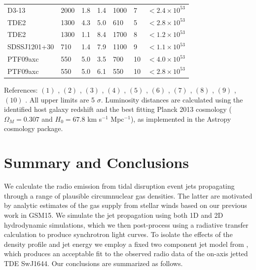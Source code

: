 \documentclass[usenatbib,fleqn]{mnras}
\begin{document}
\begin{table}
\begin{threeparttable}
\begin{tabular*}{1.5\columnwidth}{lllllll}
D3-13 & 2000 & 1.8 & 1.4 & 1000 & 7 & $< 2.4 \times 10^{ 53 }$ \\
TDE2 & 1300 & 4.3 & 5.0 & 610 & 5 & $< 2.8 \times 10^{ 53 }$ \\
TDE2 & 1300 & 1.1 & 8.4 & 1700 & 8 & $< 1.2 \times 10^{ 53 }$ \\
SDSSJ1201+30 & 710 & 1.4 & 7.9 & 1100 & 9 & $< 1.1 \times 10^{ 53 }$ \\
PTF09axc & 550 & 5.0 & 3.5 & 700 & 10 & $< 4.0 \times 10^{ 53 }$ \\
PTF09axc & 550 & 5.0 & 6.1 & 550 & 10 & $< 2.8 \times 10^{ 53 }$\\
\end{tabular*}
\begin{tablenotes}
\item References: $(1)$ \citet{Alexander+2015, van-Velzen+2015}, $(2)$
  \citet{Berger+2012, Zauderer+2013} , $(3)$ \citet{Cenko+2012}, $(4)$
  \citet{Bower+2013}, $(5)$ \citet{van-Velzen+2013}, $(6)$
  \citet{Bade+1996, Komossa&Dahlem2001}, $(7)$
  \citet{Gezari+2008,Bower+2011}, $(8)$ \citet{van-Velzen+2011}, $(9)$
  \citet{Saxton+2012}, $(10)$ \citet{Arcavi+2014}. All upper limits
  are 5 $\sigma$. Luminosity distances are calculated using the
  identified host galaxy redshift and the best fitting Planck
  2013 cosmology ($\Omega_M=0.307$ and $H_0=67.8$ km s$^{-1}$
  Mpc$^{-1}$), as implemented in the Astropy cosmology package.
\end{tablenotes}
\end{threeparttable}
\end{table}

\section{Summary and Conclusions}
\label{sec:conc}

We calculate the radio emission from tidal disruption event jets
propagating through a range of plausible circumnuclear gas densities.
The latter are motivated by analytic estimates of the gas supply from
stellar winds based on our previous work in GSM15.  We simulate the
jet propagation using both 1D and 2D hydrodynamic simulations, which
we then post-process using a radiative transfer calculation to produce
synchrotron light curves. To isolate the effects of the density
profile and jet energy we employ a fixed two component jet model from
\citet{Mimica+2015}, which produces an acceptable fit to the observed
radio data of the on-axis jetted TDE SwJ1644.  Our conclusions are
summarized as follows.
\end{document}
